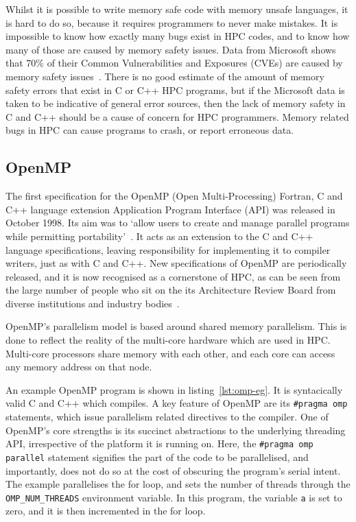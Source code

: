 Whilst it is possible to write memory safe code with memory unsafe languages, it is hard to do so, because it requires programmers to never make mistakes.
It is impossible to know how exactly many bugs exist in HPC codes, and to know how many of those are caused by memory safety issues.
Data from Microsoft shows that 70\% of their Common Vulnerabilities and Exposures (CVEs) are caused by memory safety issues~\cite{MicroBugs}. There is no good estimate of the amount of memory safety errors that exist in C or C++ HPC programs, but if the Microsoft data is taken to be indicative of general error sources, then the lack of memory safety in C and C++ should be a cause of concern for HPC programmers. Memory related bugs in HPC can cause programs to crash, or report erroneous data.


\subsection{OpenMP}
The first specification for the OpenMP (Open Multi-Processing) Fortran, C and C++ language extension Application Program Interface (API) was released in October 1998. Its aim was to `allow users to create and manage parallel programs while permitting portability'~\cite{OpenMPSpec}. It acts as an extension to the C and C++ language specifications, leaving responsibility for implementing it to compiler writers, just as with C and C++. New specifications of OpenMP are periodically released, and it is now recognised as a cornerstone of HPC, as can be seen from the large number of people who sit on the its Architecture Review Board from diverse institutions and industry bodies~\cite{OpenMPARB}.

OpenMP's parallelism model is based around shared memory parallelism. This is done to reflect the reality of the multi-core hardware which are used in HPC\@. Multi-core processors share memory with each other, and each core can access any memory address on that node.  

An example OpenMP program is shown in listing~\ref{lst:omp-eg}. It is syntacically valid C and C++ which compiles. A key feature of OpenMP are its \texttt{\#pragma omp} statements, which issue parallelism related directives to the compiler. 
One of OpenMP's core strengths is its succinct abstractions to the underlying threading API, irrespective of the platform it is running on.
Here, the \texttt{\#pragma omp parallel} statement signifies the part of the code to be parallelised, and importantly, does not do so at the cost of obscuring the program's serial intent.
The example parallelises the for loop, and sets the number of threads through the \texttt{OMP\_NUM\_THREADS} environment variable. In this program, the variable \texttt{a} is set to zero, and it is then incremented in the for loop.

